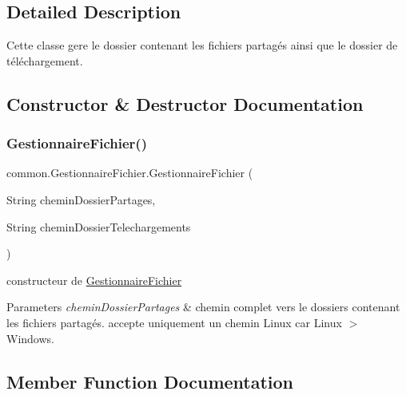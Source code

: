\subsection{Detailed Description}
Cette classe gere le dossier contenant les fichiers partagés ainsi que le dossier de téléchargement. 

\subsection{Constructor \& Destructor Documentation}
\mbox{\label{classcommon_1_1GestionnaireFichier_af063deb28fa952a2d0c605bc26659b16}} 
\subsubsection{\texorpdfstring{Gestionnaire\+Fichier()}{GestionnaireFichier()}}
{\footnotesize\ttfamily common.\+Gestionnaire\+Fichier.\+Gestionnaire\+Fichier (\begin{DoxyParamCaption}\item[{String}]{chemin\+Dossier\+Partages,  }\item[{String}]{chemin\+Dossier\+Telechargements }\end{DoxyParamCaption})\hspace{0.3cm}{\ttfamily [inline]}}



constructeur de \hyperlink{classcommon_1_1GestionnaireFichier}{Gestionnaire\+Fichier} 


\begin{DoxyParams}{Parameters}
{\em chemin\+Dossier\+Partages} & chemin complet vers le dossiers contenant les fichiers partagés. accepte uniquement un chemin Linux car Linux $>$ Windows. \\
\hline
\end{DoxyParams}


\subsection{Member Function Documentation}
\mbox{\label{classcommon_1_1GestionnaireFichier_a7aa94ceed1766208e16cd4d3ce8465b7}} 
